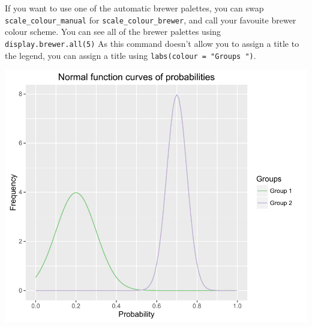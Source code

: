 If you want to use one of the automatic brewer palettes, you can swap
\texttt{scale\_colour\_manual} for \texttt{scale\_colour\_brewer}, and
call your favouite brewer colour scheme. You can see all of the brewer
palettes using \texttt{display.brewer.all(5)} As this command doesn't
allow you to assign a title to the legend, you can assign a title using
\texttt{labs(colour\ =\ "Groups\ ")}.

\begin{Shaded}
\begin{Highlighting}[]
\StringTok{ }\NormalTok{(}\NormalTok{(} \NormalTok{(}\NormalTok{, }\NormalTok{)), }\NormalTok{(} 
\StringTok{    }\NormalTok{(}  \NormalTok{(}\NormalTok{, }\NormalTok{),}
      \NormalTok{(} \NormalTok{)) +}
\StringTok{    }\NormalTok{(}  \NormalTok{(}\NormalTok{, }\NormalTok{),}
      \NormalTok{(} \NormalTok{)) +}
\StringTok{    }\NormalTok{(} \NormalTok{,}
       \NormalTok{(}\NormalTok{, }\NormalTok{, }\NormalTok{), }\NormalTok{(}\NormalTok{, }\NormalTok{)) +}
\StringTok{    }\NormalTok{(} \NormalTok{) +}
\StringTok{    }\NormalTok{(}\NormalTok{) +}
\StringTok{    }\NormalTok{(}\NormalTok{) +}
\StringTok{    }\NormalTok{(} \NormalTok{)}
\end{Highlighting}
\end{Shaded}

\begin{center}\includegraphics[width=0.6\linewidth]{9_Function_Plots_pdf/function_11-1} \end{center}

